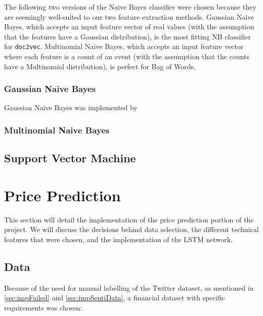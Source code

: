 \documentclass[12pt,a4paper,twoside,openright]{report}
\begin{document}
The following two versions of the Naive Bayes classifier were chosen because they are seemingly
well-suited to our two feature extraction methods. Gaussian Naive Bayes, which accepts an input
feature vector of real values (with the assumption that the features have a Gaussian distribution),
is the most fitting NB classifier for \texttt{doc2vec}. Multinomial Naive Bayes,
which accepts an input feature vector where each feature is a count of an event (with the assumption
that the counts have a Multinomial distribution), is perfect for Bag of Words.

\subsubsection{Gaussian Naive Bayes}
\label{sec:impGNB}

Gaussian Naive Bayes was implemented by

\subsubsection{Multinomial Naive Bayes}
\label{sec:impMNB}




\subsection{Support Vector Machine}
\label{sec:impSVM}

\section{Price Prediction}
\label{sec:impFin}
This section will detail the implementation of the price prediction portion
of the project. We will discuss the decisions behind data selection,
the different technical features that were chosen, and the implementation
of the LSTM network.

\subsection{Data}
\label{sec:impFinData}

Because of the need for manual labelling of the Twitter dataset, as mentioned in \cref{sec:impFailed} and 
\cref{sec:impSentiData}, a financial dataset with specific requirements was chosen:
\end{document}
